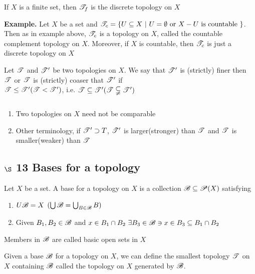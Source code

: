\begin{rmk*}
	If $X$ is a finite set, then $\mathscr{T}_f$ is the discrete topology on $X$
\end{rmk*}

\textbf{Example.} Let $X$ be a set and $\mathscr{T}_c = \{U \subseteq X~|~ U = \emptyset \text{ or } X - U \text{ is countable }\}$. Then as in example above, $\mathscr{T}_c$ is a topology on $X$, called the countable complement topology on $X$. Moreover, if $X$ is countable, then $\mathscr{T}_c$ is just a discrete topology on $X$

\begin{defn}
	Let $\mathscr{T}$ and $\mathscr{T}'$ be two topologies on $X$. We say that $\mathscr{T}'$ is (strictly) finer then $\mathscr{T}$ or $\mathscr{T}$ is (strictly) coaser that $\mathscr{T}'$ if \\$\mathscr{T} \leq \mathscr{T}'(\mathscr{T} < \mathscr{T}')$, i.e. $\mathscr{T} \subseteq \mathscr{T}'(\mathscr{T} \subsetneqq \mathscr{T}')$
\end{defn}

\begin{rmk*}$ $
	\begin{enumerate}
		\item Two topologies on $X$ need not be comparable
		\item Other terminology, if $\mathscr{T}' \supset T$, $\mathscr{T}'$ is larger(stronger) than $\mathscr{T}$ and $\mathscr{T}$ is smaller(weaker) than $\mathscr{T}$
	\end{enumerate}
\end{rmk*}

\subsection*{$\S$ 13 Bases for a topology}

\begin{defn}
	Let $X$ be a set. A base for a topology on $X$ is a collection $\mathscr{B} \subseteq \mathscr{P}(X)$ satisfying
	
	\begin{enumerate}
		\item $U\mathscr{B} = X$ $(\bigcup \mathscr{B} = \bigcup_{B \in \mathscr{B}}B)$
		\item Given $B_1,B_2 \in \mathscr{B}$ and $x \in B_1 \cap B_2 ~ \exists B_3 \in \mathscr{B} \ni x \in B_3 \subseteq B_1 \cap B_2$
	\end{enumerate}
	Members in $\mathscr{B}$ are called basic open sets in $X$
\end{defn}

Given a base $\mathscr{B}$ for a topology on $X$, we can define the smallest topology $\mathscr{T}$ on $X$ containing $\mathscr{B}$ called the topology on $X$ generated by $\mathscr{B}$.


